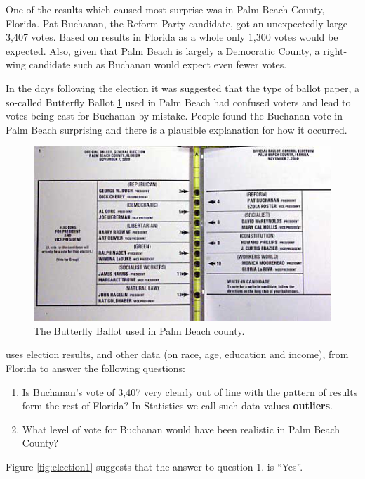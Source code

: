 \documentclass[
  british,
]{book}
\providecommand{\tightlist}{%
  \setlength{\itemsep}{0pt}\setlength{\parskip}{0pt}}
\begin{document}
One of the results which caused most surprise was in Palm Beach County, Florida. Pat Buchanan, the Reform Party candidate, got an unexpectedly large 3,407 votes. Based on results in Florida as a whole only 1,300 votes would be expected. Also, given that Palm Beach is largely a Democratic County, a right-wing candidate such as Buchanan would expect even fewer votes.

In the days following the election it was suggested that the type of ballot paper, a so-called Butterfly Ballot \ref{fig:butterfly} used in Palm Beach had confused voters and lead to votes being cast for Buchanan by mistake. People found the Buchanan vote in Palm Beach surprising and there is a plausible explanation for how it occurred.

\begin{figure}

{\centering \includegraphics[width=0.8\linewidth]{images/butterflyballot} 

}

\caption{The Butterfly Ballot used in Palm Beach county.}\label{fig:butterfly}
\end{figure}
\FloatBarrier

\citet{election} uses election results, and other data (on race, age, education and income), from Florida to answer the following questions:

\begin{enumerate}
\def\labelenumi{\arabic{enumi}.}
\tightlist
\item
  Is Buchanan's vote of 3,407 very clearly out of line with the pattern of results form the rest of Florida? In Statistics we call such data values \textbf{outliers}.
\item
  What level of vote for Buchanan would have been realistic in Palm Beach County?
\end{enumerate}

Figure \ref{fig:election1} suggests that the answer to question 1. is ``Yes''.
\end{document}
